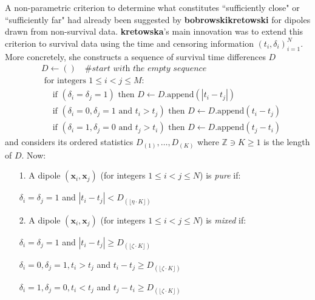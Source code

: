 \documentclass[12pt]{amsart}
\theoremstyle{definition}
\theoremstyle{plain}
\theoremstyle{remark}
\newcommand{\ZZ}{\mathbb{Z}}
\begin{document}
A non-parametric criterion to determine what constitutes ``sufficiently close" or ``sufficiently far" had already been suggested by \textbf{bobrowskikretowski} for dipoles drawn from non-survival data. \textbf{kretowska}'s main innovation was to extend this criterion to survival data using the time and censoring information $(t_i, \delta_i)_{i = 1}^N$. More concretely, she constructs a sequence of survival time differences $D$
\begin{align*}
&D \leftarrow () \quad \textit{\# start with the empty sequence} \\
&\text{ for integers } 1 \leq i < j \leq M: \\
&\quad \text{ if } (\delta_i = \delta_j = 1) \text{ then } D \leftarrow D.\text{append}(|t_i - t_j|) \\
&\quad \text{ if } (\delta_i = 0, \delta_j = 1 \text{ and } t_i > t_j) \text{ then } D \leftarrow D.\text{append}(t_i - t_j) \\
&\quad \text{ if } (\delta_i = 1, \delta_j = 0 \text{ and } t_j > t_i) \text{ then } D \leftarrow D.\text{append}(t_j - t_i)
\end{align*} and considers its ordered statistics $D_{(1)}, \ldots, D_{(K)}$ where $\ZZ \ni K \geq 1$ is the length of $D$. Now:
\begin{itemize}
	\item[1.] A dipole $(\mathbf{x}_i, \mathbf{x}_j)$ (for integers $1 \leq i < j \leq N$) is \emph{pure} if:
	
	$\delta_i = \delta_j = 1$ and $|t_i - t_j| < D_{(\lfloor \eta \cdot K \rfloor)}$
	
	\item[2.] A dipole $(\mathbf{x}_i, \mathbf{x}_j)$ (for integers $1 \leq i < j \leq N$) is \emph{mixed} if:
	
	$\delta_i = \delta_j = 1$ and $|t_i - t_j| \geq D_{(\lfloor \zeta \cdot K \rfloor)}$
	
	$\delta_i = 0, \delta_j = 1, t_i > t_j$ and $t_i - t_j \geq D_{(\lfloor \zeta \cdot K \rfloor)}$
	
	$\delta_i = 1, \delta_j = 0, t_i < t_j$ and $t_j - t_i \geq D_{(\lfloor \zeta \cdot K \rfloor)}$
\end{itemize}



\end{document}
